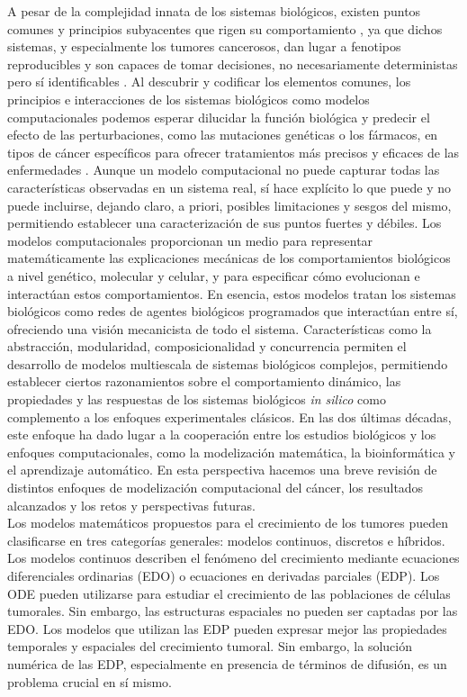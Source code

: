 A pesar de la complejidad innata de los sistemas biológicos, existen puntos comunes y principios subyacentes que rigen su comportamiento \cite{Hartwell1999}, ya que dichos sistemas, y especialmente los tumores cancerosos, dan lugar a fenotipos reproducibles y son capaces de tomar decisiones, no necesariamente deterministas pero sí identificables \cite{Hartman2001, Siegal2002}. Al descubrir y codificar los elementos comunes, los principios e interacciones de los sistemas biológicos como modelos computacionales podemos esperar dilucidar la función biológica y predecir el efecto de las perturbaciones, como las mutaciones genéticas o los fármacos, en tipos de cáncer específicos para ofrecer tratamientos más precisos y eficaces de las enfermedades \cite{DiVentura2006}. Aunque un modelo computacional no puede capturar todas las características observadas en un sistema real, sí hace explícito lo que puede y no puede incluirse, dejando claro, a priori, posibles limitaciones y sesgos del mismo, permitiendo establecer una caracterización de sus puntos fuertes y débiles. Los modelos computacionales proporcionan un medio para representar matemáticamente las explicaciones mecánicas de los comportamientos biológicos a nivel genético, molecular y celular, y para especificar cómo evolucionan e interactúan estos comportamientos. En esencia, estos modelos tratan los sistemas biológicos como redes de agentes biológicos programados que interactúan entre sí, ofreciendo una visión mecanicista de todo el sistema. Características como la abstracción, modularidad, composicionalidad y concurrencia permiten el desarrollo de modelos multiescala de sistemas biológicos complejos, permitiendo establecer ciertos razonamientos sobre el comportamiento dinámico, las propiedades y las respuestas de los sistemas biológicos \textit{in silico} como complemento a los enfoques experimentales clásicos. En las dos últimas décadas, este enfoque ha dado lugar a la cooperación entre los estudios biológicos y los enfoques computacionales, como la modelización matemática, la bioinformática y el aprendizaje automático. En esta perspectiva hacemos una breve revisión de distintos enfoques de modelización computacional del cáncer, los resultados alcanzados y los retos y perspectivas futuras.\\

Los modelos matemáticos propuestos para el crecimiento de los tumores pueden clasificarse en tres categorías generales: modelos continuos, discretos e híbridos. Los modelos continuos describen el fenómeno del crecimiento mediante ecuaciones diferenciales ordinarias (EDO) o ecuaciones en derivadas parciales (EDP). Los ODE pueden utilizarse para estudiar el crecimiento de las poblaciones de células tumorales. Sin embargo, las estructuras espaciales no pueden ser captadas por las EDO. Los modelos que utilizan las EDP pueden expresar mejor las propiedades temporales y espaciales del crecimiento tumoral. Sin embargo, la solución numérica de las EDP, especialmente en presencia de términos de difusión, es un problema crucial en sí mismo.\\

